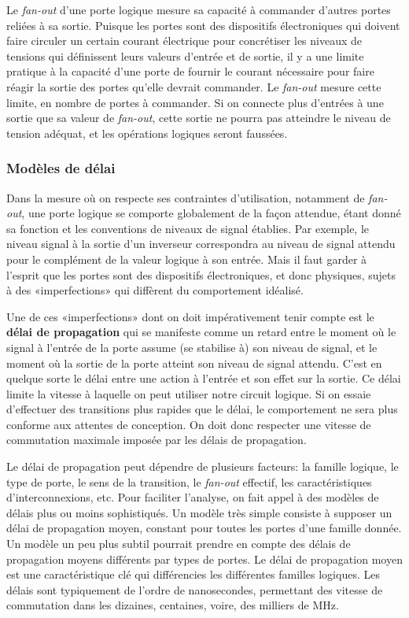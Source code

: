 \documentclass[11pt]{article}
\begin{document}
Le \emph{fan-out} d'une porte logique mesure sa capacité à commander
d'autres portes reliées à sa sortie. Puisque les portes sont des
dispositifs électroniques qui doivent faire circuler un certain
courant électrique pour concrétiser les niveaux de tensions qui
définissent leurs valeurs d'entrée et de sortie, il y a une limite
pratique à la capacité d'une porte de fournir le courant nécessaire
pour faire réagir la sortie des portes qu'elle devrait commander. Le
\emph{fan-out} mesure cette limite, en nombre de portes à commander. Si on
connecte plus d'entrées à une sortie que sa valeur de \emph{fan-out}, cette
sortie ne pourra pas atteindre le niveau de tension adéquat, et les
opérations logiques seront faussées.

\subsubsection{Modèles de délai}
\label{sec:org465afa1}

Dans la mesure où on respecte ses contraintes d'utilisation, notamment
de \emph{fan-out}, une porte logique se comporte globalement de la façon
attendue, étant donné sa fonction et les conventions de niveaux de
signal établies. Par exemple, le niveau signal à la sortie d'un
inverseur correspondra au niveau de signal attendu pour le complément
de la valeur logique à son entrée. Mais il faut garder à l'esprit que
les portes sont des dispositifs électroniques, et donc physiques,
sujets à des «imperfections» qui diffèrent du comportement idéalisé.

Une de ces «imperfections» dont on doit impérativement tenir compte
est le \textbf{délai de propagation} qui se manifeste comme un retard entre
le moment où le signal à l'entrée de la porte assume (se stabilise à)
son niveau de signal, et le moment où la sortie de la porte atteint
son niveau de signal attendu. C'est en quelque sorte le délai entre
une action à l'entrée et son effet sur la sortie. Ce délai limite la
vitesse à laquelle on peut utiliser notre circuit logique. Si on
essaie d'effectuer des transitions plus rapides que le délai, le
comportement ne sera plus conforme aux attentes de conception. On doit
donc respecter une vitesse de commutation maximale imposée par les
délais de propagation.

Le délai de propagation peut dépendre de plusieurs facteurs: la
famille logique, le type de porte, le sens de la transition, le
\emph{fan-out} effectif, les caractéristiques d'interconnexions, etc. Pour
faciliter l'analyse, on fait appel à des modèles de délais plus ou
moins sophistiqués. Un modèle très simple consiste à supposer un délai
de propagation moyen, constant pour toutes les portes d'une famille
donnée. Un modèle un peu plus subtil pourrait prendre en compte des
délais de propagation moyens différents par types de portes. Le délai
de propagation moyen est une caractéristique clé qui différencies les
différentes familles logiques. Les délais sont typiquement de l'ordre
de nanosecondes, permettant des vitesse de commutation dans les
dizaines, centaines, voire, des milliers de MHz.
\end{document}
